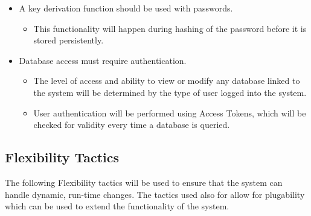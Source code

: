 \documentclass[a4paper,10pt]{article}
\begin{document}
\begin{itemize}
\begin{itemize}
				\end{itemize}
			\item A key derivation function should be used with passwords.
				\begin{itemize}
					\item This functionality will happen during hashing of the password before it is stored persistently. 
				\end{itemize}
			\item Database access must require authentication.
				\begin{itemize}
					\item The level of access and ability to view or modify any database linked to the system will be determined by the type of user logged into the system. 
					\item User authentication will be performed using Access Tokens, which will be checked for validity every time a database is queried. 
				\end{itemize}
		\end{itemize}


\subsection{Flexibility Tactics}
	The following Flexibility tactics will be used to ensure that the system can handle dynamic, run-time changes. The tactics used also for allow for plugability which can be used to extend the functionality of the system. 
	
\end{document}
